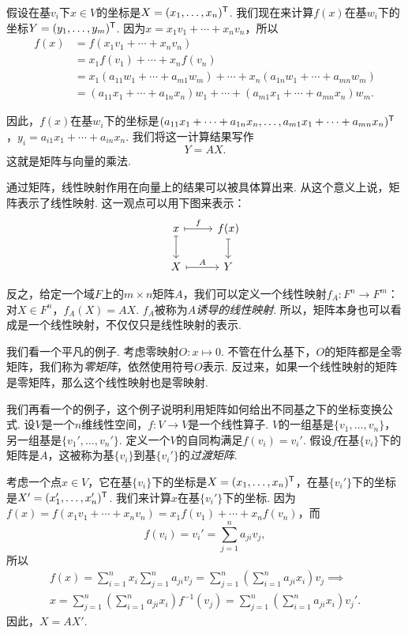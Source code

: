 假设在基$v_i$下$x\in V$的坐标是$X=(x_1,\dots,x_n)^{\mathsf{T}}$. 我们现在来计算$f(x)$在基$w_i$下的坐标$Y=(y_1,\dots,y_m)^{\mathsf{T}}$. 因为$x=x_1v_1+\cdots+x_nv_n$，所以
\begin{align*}
    f(x)&=f(x_1v_1+\cdots+x_nv_n)\\
    &=x_1f(v_1)+\cdots+x_nf(v_n)\\
    &=x_1(a_{11}w_1+\cdots+a_{m1}w_m)+\cdots+x_n(a_{1n}w_1+\cdots+a_{mn}w_m)\\
    &=(a_{11}x_1+\cdots+a_{1n}x_n)w_1+\cdots+(a_{m1}x_1+\cdots+a_{mn}x_n)w_m.
\end{align*}

因此，$f(x)$在基$w_i$下的坐标是$(a_{11}x_1+\cdots+a_{1n}x_n,\dots,a_{m1}x_1+\cdots+a_{mn}x_n)^{\mathsf{T}}$，$y_i=a_{i1}x_1+\cdots+a_{in}x_n$. 我们将这一计算结果写作
\[Y=AX.\]
这就是矩阵与向量的乘法.

通过矩阵，线性映射作用在向量上的结果可以被具体算出来. 从这个意义上说，矩阵表示了线性映射. 这一观点可以用下图来表示：
\[\begin{tikzcd}
    x\arrow[r,mapsto,"f"]\arrow[d,mapsto]&f(x)\arrow[d,mapsto]\\
    X\arrow[r,mapsto,"A"]&Y
    \end{tikzcd}\] 

反之，给定一个域$F$上的$m\times n$矩阵$A$，我们可以定义一个线性映射$f_A:F^n\to F^m$：对$X\in F^n$，$f_A(X)=AX$. $f_A$被称为$A$\emph{诱导的线性映射}. 所以，矩阵本身也可以看成是一个线性映射，不仅仅只是线性映射的表示. 

我们看一个平凡的例子. 考虑零映射$O:x\mapsto 0$. 不管在什么基下，$O$的矩阵都是全零矩阵，我们称为\emph{零矩阵}，依然使用符号$O$表示. 反过来，如果一个线性映射的矩阵是零矩阵，那么这个线性映射也是零映射. 

我们再看一个的例子，这个例子说明利用矩阵如何给出不同基之下的坐标变换公式. 设$V$是一个$n$维线性空间，$f:V\to V$是一个线性算子. $V$的一组基是$\{v_1,\dots,v_n\}$，另一组基是$\{v_1',\dots,v_n'\}$. 定义一个$V$的自同构满足$f(v_i)=v_i'$. 假设$f$在基$\{v_i\}$下的矩阵是$A$，这被称为基$\{v_i\}$到基$\{v_i'\}$的\emph{过渡矩阵}.

考虑一个点$x\in V$，它在基$\{v_i\}$下的坐标是$X=(x_1,\dots,x_n)^{\mathsf{T}}$，在基$\{v_i'\}$下的坐标是$X'=(x_1',\dots,x_n')^{\mathsf{T}}$. 我们来计算$x$在基$\{v_i'\}$下的坐标. 因为$f(x)=f(x_1v_1+\cdots+x_nv_n)=x_1f(v_1)+\cdots+x_nf(v_n)$，而
\[f(v_i)=v_i'=\sum_{j=1}^n a_{ji}v_j,\]
所以
\begin{gather*}
f(x)=\sum_{i=1}^n x_i\sum_{j=1}^n a_{ji}v_j=\sum_{j=1}^n\left(\sum_{i=1}^n a_{ji}x_i\right)v_j\implies\\
 x=\sum_{j=1}^n\left(\sum_{i=1}^n a_{ji}x_i\right)f^{-1}(v_j)=\sum_{j=1}^n\left(\sum_{i=1}^n a_{ji}x_i\right)v_j'.
\end{gather*}
因此，$X=AX'$.


